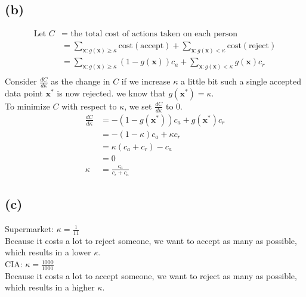 \documentclass{article}
\begin{document}
	\subsection*{(b)}
		\begin{align*}
			\text{Let }C &= \text{ the total cost of actions taken on each person}\\
			&= \sum\limits_{\mathbf x: g(\mathbf x) \geq \kappa}\text{cost}(\text{accept}) + \sum\limits_{\mathbf x: g(\mathbf x) < \kappa}\text{cost}(\text{reject})\\
			&= \sum\limits_{\mathbf x: g(\mathbf x) \geq \kappa}(1-g(\mathbf x))c_a + \sum\limits_{\mathbf x: g(\mathbf x) < \kappa}g(\mathbf x)c_r\\
		\end{align*}
		Consider $\frac{dC}{d\kappa}$ as the change in $C$ if we increase $\kappa$ a little bit such a single accepted data point $\mathbf x^*$ is now rejected. we know that $g(\mathbf x^*) = \kappa$.\\
		To minimize $C$ with respect to $\kappa$, we set $\frac{dC}{d\kappa}$ to 0.
		\begin{align*}
			\frac{dC}{d\kappa} &= -(1-g(\mathbf x^*))c_a + g(\mathbf x^*)c_r\\
			&= -(1-\kappa)c_a + \kappa c_r\\
			&= \kappa(c_a + c_r) - c_a\\
			&= 0\\
			\kappa &= \frac{c_a}{c_r + c_a}					
		\end{align*}
	
	\subsection*{(c)}
		Supermarket: $\kappa = \frac1{11}$\\
		Because it costs a lot to reject someone, we want to accept as many as possible, which results in a lower $\kappa$.\\
		CIA: $\kappa = \frac{1000}{1001}$\\
		Because it costs a lot to accept someone, we want to reject as many as possible, which results in a higher $\kappa$. 
\end{document}
